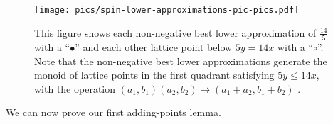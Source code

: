 \documentclass{amsart}
\theoremstyle{plain}
\theoremstyle{definition}
\theoremstyle{remark}
\numberwithin{equation}{section}
\begin{document}
\begin{figure}[H]\label{fig:s14/5-lattice}
\texttt{[image: pics/spin-lower-approximations-pic-pics.pdf]}
\caption{This figure shows each non-negative best lower approximation of $\frac{14}{5}$ with a ``$\bullet$'' and each other lattice point below $5y=14x$ with a ``$\circ$''.  Note that the non-negative best lower approximations generate the monoid of lattice points in the first quadrant satisfying  $5y \le 14x$, with the operation $(a_1, b_1)(a_2, b_2)\mapsto (a_1 + a_2, b_1 + b_2)$ .}
\end{figure}

We can now prove our first adding-points lemma.
\end{document}
